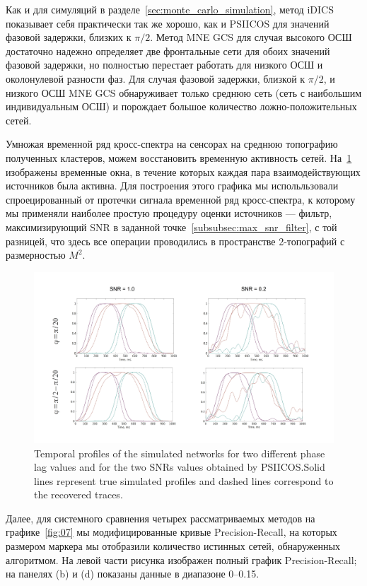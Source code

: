 Как и для симуляций в разделе~\ref{sec:monte_carlo_simulation}, метод iDICS показывает себя
практически так же хорошо, как и PSIICOS для значений фазовой задержки, близких к $\pi/2$.
Метод MNE GCS для случая высокого ОСШ достаточно надежно определяет две фронтальные сети для
обоих значений фазовой задержки, но полностью перестает работать для низкого ОСШ и
околонулевой разности фаз. Для случая фазовой задержки, близкой к $\pi/2$, и низкого ОСШ
MNE GCS обнаруживает только среднюю сеть (сеть с наибольшим индивидуальным ОСШ) и
порождает большое количество ложно-положительных сетей.

Умножая временной ряд кросс-спектра на сенсорах на среднюю топографию
полученных кластеров, можем восстановить временную активность сетей.
На~\ref{fig:06} изображены временные окна, в течение которых каждая пара
взаимодействующих источников была активна.  Для построения этого графика мы
испольльзовали спроецированный от протечки сигнала временной ряд кросс-спектра,
к которому мы применяли наиболее простую процедуру оценки источников ---
фильтр, максимизирующий SNR в заданной точке~\ref{subsubsec:max_snr_filter}, с
той разницей, что здесь все операции проводились в пространстве 2-топографий с
размерностью $M^2$.

\begin{figure}[!ht]
    \includegraphics[width=1\textwidth]{../images/psiicos_paper/Figure6_hr.jpg}
    \caption{Temporal profiles of the simulated networks for two different
        phase lag values and for the two SNRs values obtained by PSIICOS.\@ Solid
        lines represent true simulated profiles and dashed lines
        correspond to the recovered traces.  }\label{fig:06} %
\end{figure}%

Далее, для системного сравнения четырех рассматриваемых методов на графике~\ref{fig:07}
мы модифицированные кривые Precision-Recall, на которых размером маркера мы отобразили
количество истинных сетей, обнаруженных алгоритмом. На левой части рисунка изображен
полный график Precision-Recall; на панелях (b) и (d) показаны данные в диапазоне 0--0.15.

